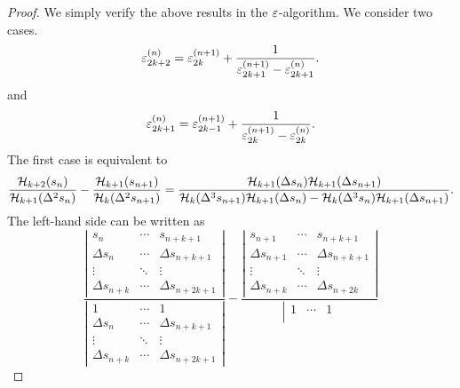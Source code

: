 \begin{proof}
    We simply verify the above results in the $\varepsilon$-algorithm. We consider two cases. 
    \begin{equation}
    \varepsilon_{2k+2}^{(n)} = \varepsilon_{2k}^{(n+1)} + \frac{1}{\varepsilon_{2k+1}^{(n+1)} - \varepsilon_{2k+1}^{(n)}}.
    \end{equation}
    and 
    \begin{equation}
    \varepsilon_{2k+1}^{(n)} = \varepsilon_{2k-1}^{(n+1)} + \frac{1}{\varepsilon_{2k}^{(n+1)} - \varepsilon_{2k}^{(n)}}.   
    \end{equation}
    The first case is equivalent to 
    \begin{equation}
        \frac{\mathcal H_{k+2}(s_n)}{\mathcal H_{k+1}(\Delta^2 s_n)} - \frac{\mathcal H_{k+1}(s_{n+1})}{\mathcal H_{k}(\Delta^2 s_{n+1})} = \frac{\mathcal H_{k+1}(\Delta s_n) \mathcal H_{k+1}(\Delta s_{n+1}) }{\mathcal H_{k}(\Delta^3 s_{n+1})\mathcal H_{k+1}(\Delta s_n) - \mathcal H_{k}(\Delta^3 s_n)\mathcal H_{k+1}(\Delta s_{n+1}) }.
    \end{equation}
    The left-hand side can be written as
    \begin{equation}
        \frac{\left| \begin{matrix}
            s_n & \cdots & s_{n+k+1} \\ 
            \Delta s_n & \cdots & \Delta s_{n+k+1} \\
            \vdots & \ddots & \vdots \\
            \Delta s_{n+k} & \cdots & \Delta s_{n+2k+1}
        \end{matrix}   \right|}{\left|  \begin{matrix}
            1 & \cdots & 1 \\ 
            \Delta s_n & \cdots & \Delta s_{n+k+1} \\
            \vdots & \ddots & \vdots \\
            \Delta s_{n+k} & \cdots & \Delta s_{n+2k+1}
        \end{matrix}    \right|} -         
        \frac{\left| \begin{matrix}
            s_{n+1} & \cdots & s_{n+k+1} \\ 
            \Delta s_{n+1} & \cdots & \Delta s_{n+k+1} \\
            \vdots & \ddots & \vdots \\
            \Delta s_{n+k} & \cdots & \Delta s_{n+2k}
        \end{matrix}   \right|}{\left|  \begin{matrix}
            1 & \cdots & 1 \\ 

\end{matrix}}
\end{equation}
\end{proof}

